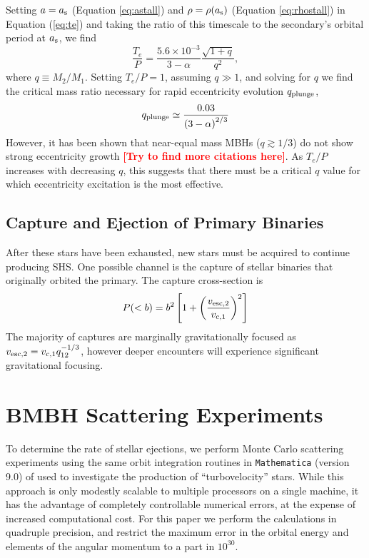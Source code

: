 \documentclass[a4paper,twocolumn]{emulateapj}
\newcommand{\colr}[1]{{\bf \textcolor{red}{[#1]}}}
\begin{document}
Setting $a = a_{\rm s}$ (Equation \ref{eq:astall}) and $\rho = \rho(a_{\rm s})$ (Equation \ref{eq:rhostall}) in Equation (\ref{eq:te}) and taking the ratio of this timescale to the secondary's orbital period at $a_{\rm s}$, we find
\begin{equation}
\frac{T_{e}}{P} = \frac{5.6 \times 10^{-3}}{3 - \alpha} \frac{\sqrt{1 + q}}{q^{2}},
\end{equation}
where $q \equiv M_{2}/M_{1}$. Setting $T_{e}/P = 1$, assuming $q \gg 1$, and solving for $q$ we find the critical mass ratio necessary for rapid eccentricity evolution $q_{\rm plunge}$,
\begin{equation}
q_{\rm plunge} \simeq \frac{0.03}{\left(3 - \alpha\right)^{2/3}} \label{eq:qplunge}
\end{equation}
However, it has been shown that near-equal mass MBHs ($q \gtrsim 1/3$) do not show strong eccentricity growth \citep{Sesana:2010a} \colr{Try to find more citations here}. As $T_{e}/P$ increases with decreasing $q$, this suggests that there must be a critical $q$ value for which eccentricity excitation is the most effective.

\subsection{Capture and Ejection of Primary Binaries}

After these stars have been exhausted, new stars must be acquired to continue producing SHS. One possible channel is the capture of stellar binaries that originally orbited the primary. The capture cross-section is
\begin{equation}
P(< b) = b^2 \left[1 + \left(\frac{v_{\rm esc,2}}{v_{\rm c,1}}\right)^2 \right]
\end{equation}
The majority of captures are marginally gravitationally focused as $v_{\rm esc,2} = v_{\rm c,1} q_{12}^{-1/3}$, however deeper encounters will experience significant gravitational focusing.

\section{BMBH Scattering Experiments}\label{sec:experiments}
To determine the rate of stellar ejections, we perform Monte Carlo scattering experiments using the same orbit integration routines in {\tt Mathematica} (version 9.0) of \citet{Manukian:2013a} used to investigate the production of ``turbovelocity'' stars. While this approach is only modestly scalable to multiple processors on a single machine, it has the advantage of completely controllable numerical errors, at the expense of increased computational cost. For this paper we perform the calculations in quadruple precision, and restrict the maximum error in the orbital energy and elements of the angular momentum to a part in $10^{30}$.
\end{document}

